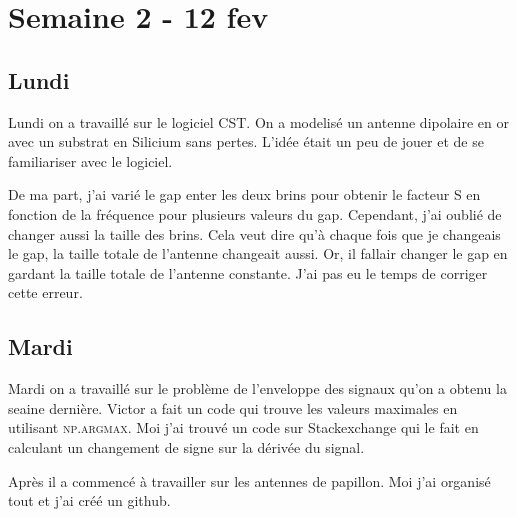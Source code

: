 \section{Semaine 2 - 12 fev}

\subsection{Lundi}

Lundi on a travaillé sur le logiciel CST. On a modelisé un antenne
dipolaire en or avec un substrat en Silicium sans pertes. L'idée
était un peu de jouer et de se familiariser avec le logiciel.

De ma part, j'ai varié le gap enter les deux brins pour obtenir le facteur S
en fonction de la fréquence pour plusieurs valeurs du gap. Cependant, j'ai oublié
de changer aussi la taille des brins. Cela veut dire qu'à chaque fois que je changeais
le gap, la taille totale de l'antenne changeait aussi. Or, il fallair changer le gap
en gardant la taille totale de l'antenne constante. J'ai pas eu le temps de corriger 
cette erreur.

\subsection{Mardi}

Mardi on a travaillé sur le problème de l'enveloppe des signaux qu'on a obtenu la
seaine dernière. Victor a fait un code qui trouve les valeurs maximales en utilisant
\textsc{np.argmax}. Moi j'ai trouvé un code sur Stackexchange qui le fait en calculant
un changement de signe sur la dérivée du signal. 

Après il a commencé à travailler sur les antennes de papillon. Moi j'ai organisé tout et 
j'ai créé un github.
